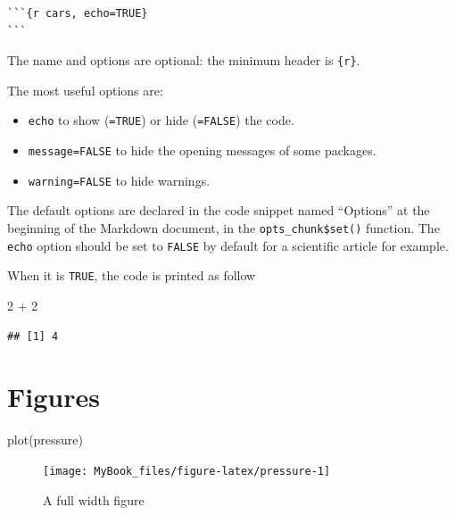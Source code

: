 \documentclass[
  12pt,
  american,
  a4paper,
  extrafontsizes,onecolumn,openright
  ]{memoir}
\newenvironment{Shaded}{\begin{snugshade}}{\end{snugshade}}
\newcommand{\DecValTok}[1]{\textcolor[rgb]{0.00,0.00,0.81}{#1}}
\newcommand{\FunctionTok}[1]{\textcolor[rgb]{0.00,0.00,0.00}{#1}}
\newcommand{\NormalTok}[1]{#1}
\newcommand{\SpecialCharTok}[1]{\textcolor[rgb]{0.00,0.00,0.00}{#1}}
\providecommand{\tightlist}{%
  \setlength{\itemsep}{0pt}\setlength{\parskip}{0pt}}
\begin{document}
\begin{verbatim}
```{r cars, echo=TRUE}
```
\end{verbatim}

The name and options are optional: the minimum header is \texttt{\{r\}}.

The most useful options are:

\begin{itemize}
\tightlist
\item
  \texttt{echo} to show (\texttt{=TRUE}) or hide (\texttt{=FALSE}) the code.
\item
  \texttt{message=FALSE} to hide the opening messages of some packages.
\item
  \texttt{warning=FALSE} to hide warnings.
\end{itemize}

The default options are declared in the code snippet named ``Options'' at the beginning of the Markdown document, in the \texttt{opts\_chunk\$set()} function.
The \texttt{echo} option should be set to \texttt{FALSE} by default for a scientific article for example.

When it is \texttt{TRUE}, the code is printed as follow

\scriptsize

\begin{Shaded}
\begin{Highlighting}[]
\DecValTok{2} \SpecialCharTok{+} \DecValTok{2}
\end{Highlighting}
\end{Shaded}

\begin{verbatim}
## [1] 4
\end{verbatim}

\normalsize

\hypertarget{figures}{%
\section{Figures}\label{figures}}

\scriptsize

\begin{Shaded}
\begin{Highlighting}[]
\FunctionTok{plot}\NormalTok{(pressure)}
\end{Highlighting}
\end{Shaded}

\begin{figure}

{\centering \texttt{[image: MyBook\_files/figure-latex/pressure-1]} 

}

\caption{A full width figure}\label{fig:pressure}
\end{figure}
\end{document}
